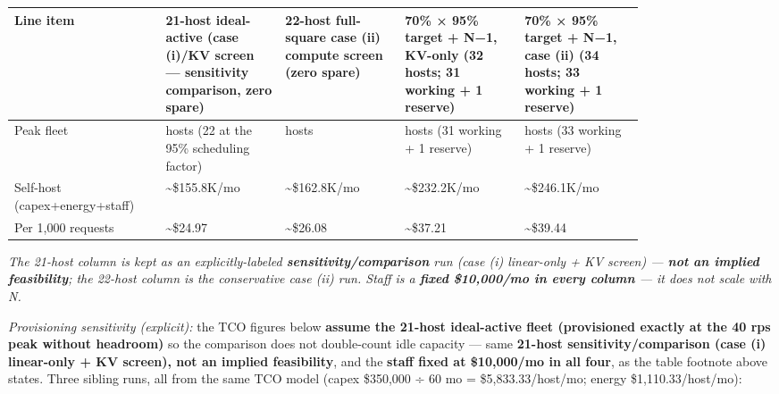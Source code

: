 \nopagebreak[4]
\begin{longtable}[]{@{}
  >{\raggedright\arraybackslash}p{0.1647\linewidth}
  >{\raggedright\arraybackslash}p{0.1647\linewidth}
  >{\raggedright\arraybackslash}p{0.1647\linewidth}
  >{\raggedright\arraybackslash}p{0.1647\linewidth}
  >{\raggedright\arraybackslash}p{0.1647\linewidth}@{}}
\toprule\noalign{}
\begin{minipage}[b]{\linewidth}\raggedright
Line item
\end{minipage} & \begin{minipage}[b]{\linewidth}\raggedright
21-host ideal-active (case (i)/KV screen --- \textbf{sensitivity
comparison}, zero spare)
\end{minipage} & \begin{minipage}[b]{\linewidth}\raggedright
22-host full-square case (ii) compute screen (zero spare)
\end{minipage} & \begin{minipage}[b]{\linewidth}\raggedright
70\% × 95\% target + N−1, KV-only (32 hosts; 31 working + 1 reserve)
\end{minipage} & \begin{minipage}[b]{\linewidth}\raggedright
70\% × 95\% target + N−1, case (ii) (34 hosts; 33 working + 1 reserve)
\end{minipage} \\
\midrule\noalign{}
\endhead
\bottomrule\noalign{}
\endlastfoot
Peak fleet & 21 hosts (22 at the 95\% scheduling factor) & 22 hosts & 32
hosts (31 working + 1 reserve) & 34 hosts (33 working + 1 reserve) \\
\noalign{\label{tab:16.4}}
Self-host (capex+energy+staff) & \textasciitilde\$155.8K/mo &
\textasciitilde\$162.8K/mo & \textasciitilde\$232.2K/mo &
\textasciitilde\$246.1K/mo \\
Per 1,000 requests & \textasciitilde\$24.97 & \textasciitilde\$26.08 &
\textasciitilde\$37.21 & \textasciitilde\$39.44 \\
\end{longtable}

\emph{The 21-host column is kept as an explicitly-labeled
\textbf{sensitivity/comparison} run (case (i) linear-only + KV screen)
--- \textbf{not an implied feasibility}; the 22-host column is the
conservative case (ii) run. Staff is a \textbf{fixed \$10,000/mo in
every column} --- it does not scale with N.}

\emph{Provisioning sensitivity (explicit):} the TCO figures below
\textbf{assume the 21-host ideal-active fleet (provisioned exactly at
the 40 rps peak without headroom)} so the comparison does not
double-count idle capacity --- same \textbf{21-host
sensitivity/comparison (case (i) linear-only + KV screen), not an
implied feasibility}, and the \textbf{staff fixed at \$10,000/mo in all
four}, as the table footnote above states. Three sibling runs, all from
the same TCO model (capex \$350,000 ÷ 60 mo = \$5,833.33/host/mo; energy
\$1,110.33/host/mo):

